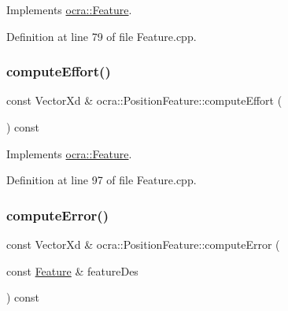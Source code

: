 Implements \hyperlink{classocra_1_1Feature_a19626a241666fdae253af1f7b6f2acd7}{ocra\+::\+Feature}.



Definition at line 79 of file Feature.\+cpp.

\hypertarget{classocra_1_1PositionFeature_a31fda0cc674bf08b067c12af39c5fbdd}{}\label{classocra_1_1PositionFeature_a31fda0cc674bf08b067c12af39c5fbdd} 
\subsubsection{\texorpdfstring{compute\+Effort()}{computeEffort()}\hspace{0.1cm}{\footnotesize\ttfamily [2/2]}}
{\footnotesize\ttfamily const Vector\+Xd \& ocra\+::\+Position\+Feature\+::compute\+Effort (\begin{DoxyParamCaption}{ }\end{DoxyParamCaption}) const\hspace{0.3cm}{\ttfamily [virtual]}}



Implements \hyperlink{classocra_1_1Feature_ae43f2ffc54862d6ddc0b02fd39431eb6}{ocra\+::\+Feature}.



Definition at line 97 of file Feature.\+cpp.

\hypertarget{classocra_1_1PositionFeature_af347aeca5c5f531f8cae97311515814e}{}\label{classocra_1_1PositionFeature_af347aeca5c5f531f8cae97311515814e} 
\subsubsection{\texorpdfstring{compute\+Error()}{computeError()}\hspace{0.1cm}{\footnotesize\ttfamily [1/2]}}
{\footnotesize\ttfamily const Vector\+Xd \& ocra\+::\+Position\+Feature\+::compute\+Error (\begin{DoxyParamCaption}\item[{const \hyperlink{classocra_1_1Feature}{Feature} \&}]{feature\+Des }\end{DoxyParamCaption}) const\hspace{0.3cm}{\ttfamily [virtual]}}



